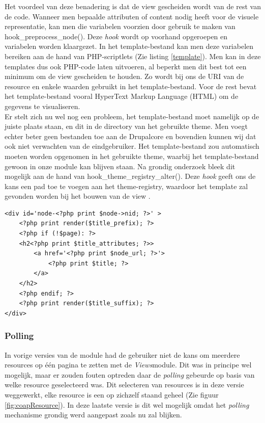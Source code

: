 Het voordeel van deze benadering is dat de view gescheiden wordt van de rest van de code. Wanneer men bepaalde attributen of content nodig heeft voor de visuele representatie, kan men die variabelen voorzien door gebruik te maken van hook\_preprocess\_node(). Deze \textit{hook} wordt op voorhand opgeroepen en variabelen worden klaargezet. In het template-bestand kan men deze variabelen bereiken aan de hand van PHP-scriptlets (Zie listing \ref{template}). Men kan in deze templates dus ook PHP-code laten uitvoeren, al beperkt men dit best tot een minimum om de view gescheiden te houden. Zo wordt bij ons de URI van de resource en enkele waarden gebruikt in het template-bestand. Voor de rest bevat het template-bestand vooral HyperText Markup Language (HTML)  om de gegevens te visualiseren.\\

Er stelt zich nu wel nog een probleem, het template-bestand moet namelijk op de juiste plaats staan, en dit in de directory van het gebruikte theme. Men voegt echter beter geen bestanden toe aan de Drupalcore en bovendien kunnen wij dat ook niet verwachten van de eindgebruiker. Het template-bestand zou automatisch moeten worden opgenomen in het gebruikte theme, waarbij het template-bestand gewoon in onze module kan blijven staan. Na grondig onderzoek bleek dit mogelijk aan de hand van hook\_theme\_registry\_alter(). Deze \textit{hook} geeft ons de kans een pad toe te voegen aan het theme-registry, waardoor het template zal gevonden worden bij het bouwen van de view \cite{addTemplate}.

\lstset{language=HTML}
\begin{lstlisting}[label=template,caption=Voorbeeld van een template met PHP-scriptlets (node.tpl.php)]
<div id='node-<?php print $node->nid; ?>' >
	<?php print render($title_prefix); ?>
	<?php if (!$page): ?>
	<h2<?php print $title_attributes; ?>>
		<a href='<?php print $node_url; ?>'>
			<?php print $title; ?>
		</a>
	</h2>
	<?php endif; ?>
	<?php print render($title_suffix); ?>
</div>
\end{lstlisting}

\noindent

\subsubsection{Polling}\label{polling}
In vorige versies van de module had de gebruiker niet de kans om meerdere resources op \'{e}\'{e}n pagina te zetten met de \textit{Views}module. Dit was in principe wel mogelijk, maar er zouden fouten optreden daar de \textit{polling} gebeurde op basis van welke resource geselecteerd was. Dit selecteren van resources is in deze versie weggewerkt, elke resource is een op zichzelf staand geheel (Zie figuur \ref{fig:coapResource}). In deze laatste versie is dit wel mogelijk omdat het \textit{polling} mechanisme grondig werd aangepast zoals nu zal blijken.\\

